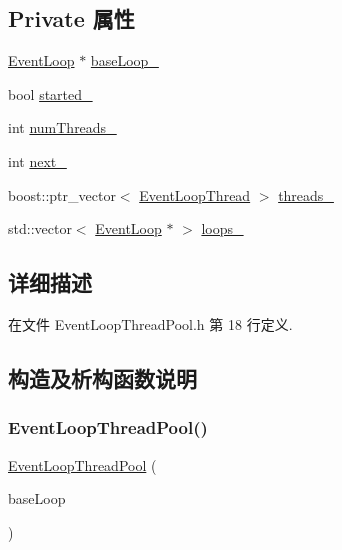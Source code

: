 \subsection*{Private 属性}
\begin{DoxyCompactItemize}
\item 
\hyperlink{classmuduo_1_1EventLoop}{Event\+Loop} $\ast$ \hyperlink{classmuduo_1_1EventLoopThreadPool_abd40a665f0987cb18463ec326b966b06}{base\+Loop\+\_\+}
\item 
bool \hyperlink{classmuduo_1_1EventLoopThreadPool_a5ad69cfc4163d7797bc0f0d7eadb95a7}{started\+\_\+}
\item 
int \hyperlink{classmuduo_1_1EventLoopThreadPool_ace47a99e5a5a2f2f0cd96ab6108d432b}{num\+Threads\+\_\+}
\item 
int \hyperlink{classmuduo_1_1EventLoopThreadPool_aca74906911b1be75766735048142edae}{next\+\_\+}
\item 
boost\+::ptr\+\_\+vector$<$ \hyperlink{classmuduo_1_1EventLoopThread}{Event\+Loop\+Thread} $>$ \hyperlink{classmuduo_1_1EventLoopThreadPool_aa5d7bf46fd47a27bf0fd76b1dfad1fb1}{threads\+\_\+}
\item 
std\+::vector$<$ \hyperlink{classmuduo_1_1EventLoop}{Event\+Loop} $\ast$ $>$ \hyperlink{classmuduo_1_1EventLoopThreadPool_a07ba07ac88b81aabf4b59f19f6494c3f}{loops\+\_\+}
\end{DoxyCompactItemize}


\subsection{详细描述}


在文件 Event\+Loop\+Thread\+Pool.\+h 第 18 行定义.



\subsection{构造及析构函数说明}
\mbox{\label{classmuduo_1_1EventLoopThreadPool_ab1abd52cc351211b66982ad02e306ac6}} 
\subsubsection{\texorpdfstring{Event\+Loop\+Thread\+Pool()}{EventLoopThreadPool()}}
{\footnotesize\ttfamily \hyperlink{classmuduo_1_1EventLoopThreadPool}{Event\+Loop\+Thread\+Pool} (\begin{DoxyParamCaption}\item[{\hyperlink{classmuduo_1_1EventLoop}{Event\+Loop} $\ast$}]{base\+Loop }\end{DoxyParamCaption})}



